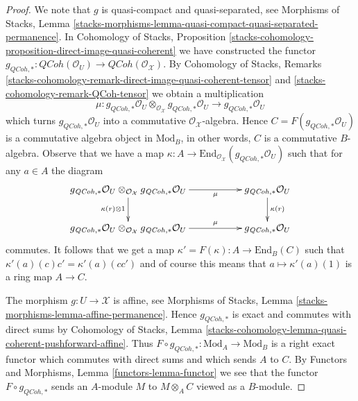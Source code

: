 \documentclass[10pt,a4paper]{amsart}
\theoremstyle{plain}
\theoremstyle{definition}
\theoremstyle{remark}
\numberwithin{equation}{subsection}
\def\QCoh{\mathit{QCoh}}
\begin{document}
\begin{proof}
We note that $g$ is quasi-compact and quasi-separated, see
Morphisms of Stacks, Lemma
\ref{stacks-morphisms-lemma-quasi-compact-quasi-separated-permanence}.
In Cohomology of Stacks, Proposition
\ref{stacks-cohomology-proposition-direct-image-quasi-coherent}
we have constructed the functor
$g_{\QCoh, *} : \QCoh(\mathcal{O}_U) \to \QCoh(\mathcal{O}_\mathcal{X})$.
By Cohomology of Stacks, Remarks
\ref{stacks-cohomology-remark-direct-image-quasi-coherent-tensor} and
\ref{stacks-cohomology-remark-QCoh-tensor}
we obtain a multiplication
$$
\mu :
g_{\QCoh, *}\mathcal{O}_U
\otimes_{\mathcal{O}_\mathcal{X}}
g_{\QCoh, *}\mathcal{O}_U
\longrightarrow
g_{\QCoh, *}\mathcal{O}_U
$$
which turns $g_{\QCoh, *}\mathcal{O}_U$ into a commutative
$\mathcal{O}_\mathcal{X}$-algebra. Hence $C = F(g_{\QCoh, *}\mathcal{O}_U)$
is a commutative algebra object in $\text{Mod}_B$, in other words, $C$ is a
commutative $B$-algebra. Observe that we have a map
$\kappa : A \to \text{End}_{\mathcal{O}_\mathcal{X}}(g_{\QCoh, *}\mathcal{O}_U)$
such that for any $a \in A$ the diagram
$$
\xymatrix{
g_{\QCoh, *}\mathcal{O}_U \otimes_{\mathcal{O}_\mathcal{X}}
g_{\QCoh, *}\mathcal{O}_U
\ar[d]_{\kappa(r) \otimes 1} \ar[rr]_-\mu & &
g_{\QCoh, *}\mathcal{O}_U \ar[d]^{\kappa(r)} \\
g_{\QCoh, *}\mathcal{O}_U \otimes_{\mathcal{O}_\mathcal{X}}
g_{\QCoh, *}\mathcal{O}_U
\ar[rr]^-\mu & &
g_{\QCoh, *}\mathcal{O}_U
}
$$
commutes. It follows that we get a map
$\kappa' = F(\kappa) : A \to \text{End}_B(C)$
such that $\kappa'(a)(c) c' = \kappa'(a)(cc')$ and of course this means that
$a \mapsto \kappa'(a)(1)$ is a ring map $A \to C$.

\medskip\noindent
The morphism $g : U \to \mathcal{X}$ is affine, see
Morphisms of Stacks, Lemma \ref{stacks-morphisms-lemma-affine-permanence}.
Hence $g_{\QCoh, *}$ is exact and commutes with direct sums by
Cohomology of Stacks, Lemma
\ref{stacks-cohomology-lemma-quasi-coherent-pushforward-affine}.
Thus $F \circ g_{\QCoh, *} : \text{Mod}_A \to \text{Mod}_B$
is a right exact functor which commutes with direct sums
and which sends $A$ to $C$.
By Functors and Morphisms, Lemma \ref{functors-lemma-functor}
we see that the functor $F \circ g_{\QCoh, *}$ sends an $A$-module
$M$ to $M \otimes_A C$ viewed as a $B$-module.
\end{proof}
\end{document}

